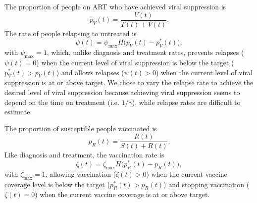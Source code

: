 \documentclass{article}
\begin{document}
The proportion of people on ART who have achieved viral suppression is
\begin{equation}
  p_V(t) = \frac{V(t)}{T(t) + V(t)}.
\end{equation}
The rate of people relapsing to untreated is
\begin{equation}
  \label{relapse_rate}
  \psi(t) = \psi_{\max} H\big(p_V(t) - p_V^*(t)\big),
\end{equation}
with $\psi_{\max} = 1$, which, unlike diagnosis and treatment rates,
prevents relapses ($\psi(t) = 0$) when the current level of viral
suppression is below the target ($p_V^*(t) > p_V(t)$) and allows
relapses ($\psi(t) > 0$) when the current level of viral suppression
is at or above target.  We chose to vary the relapse rate to achieve
the desired level of viral suppression because achieving viral
suppression seems to depend on the time on treatment (i.e.
$1 / \gamma$), while relapse rates are difficult to estimate.

The proportion of susceptible people vaccinated is
\begin{equation}
  p_R(t) = \frac{R(t)}{S(t) + R(t)}.
\end{equation}
Like diagnosis and treatment, the vaccination rate is
\begin{equation}
  \label{vaccination_rate}
  \zeta(t) = \zeta_{\max} H\big(p_R^*(t) - p_R(t)\big),
\end{equation}
with $\zeta_{\max} = 1$, allowing vaccination ($\zeta(t) > 0$) when
the current vaccine coverage level is below the target
($p_R^*(t) > p_R(t)$) and stopping vaccination ($\zeta(t) = 0$) when
the current vaccine coverage is at or above target.
\end{document}
